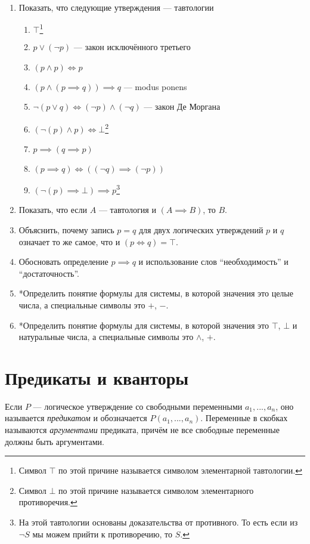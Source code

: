 \begin{enumerate}
	\item{}Показать, что следующие утверждения --- тавтологии
	\begin{enumerate}
		\item{}$\top$\footnote{Символ $\top$ по этой причине называется
			символом элементарной тавтологии.}
		\item{}$p\lor (\lnot p)$ --- закон исключённого третьего
		\item{}$(p\land p)\iff p$
		\item{}$(p\land (p\implies q))\implies q$ --- modus ponens
		\item{}$\lnot(p\lor q)\iff (\lnot p)\land (\lnot q)$ --- закон Де Моргана
		\item{}$(\lnot(p)\land p)\iff\bot$\footnote{Символ $\bot$ по этой причине называется
			символом элементарного противоречия.}
		\item{}$p\implies (q\implies p)$
		\item{}${(p\implies q)\iff ((\lnot q)\implies (\lnot p))}$
		\item{}$(\lnot(p)\implies\bot)\implies p$\footnote{На этой тавтологии основаны
			доказательства от противного. То есть если из $\lnot S$ мы можем прийти
			к противоречию, то $S$.}
	\end{enumerate}
	\item{}Показать, что если $A$ --- тавтология и $(A\implies B)$, то $B$.
	\item{}Объяснить, почему запись $p=q$ для двух логических утверждений $p$ и $q$
	означает то же самое, что и $(p\iff q)=\top$.
	\item{}\label{ex:imply_def}Обосновать определение ${p\implies q}$ и использование
	слов ``необходимость'' и ``достаточность''.
	\item{}*Определить понятие формулы для системы, в которой значения это целые числа,
	а специальные символы это $+$, $-$.
	\item{}*Определить понятие формулы для системы, в которой значения это $\top$, $\bot$
	и натуральные числа, а специальные символы это $\land$,  $+$.
\end{enumerate}

\section{Предикаты и кванторы}

Если $P$ --- логическое утверждение со свободными переменными $a_1,...,a_{n}$,
оно называется {\it предикатом} и обозначается $P(a_1,...,a_{n})$. Переменные
в скобках называются {\it аргументами} предиката, причём не все свободные
переменные должны быть аргументами.

